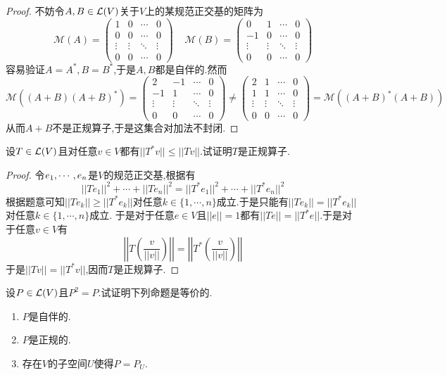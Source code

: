 \documentclass{ctexart}
\begin{document}
\begin{proof}
    不妨令$A,B\in\mathcal{L}(V)$关于$V$上的某规范正交基的矩阵为
    \[\mathcal{M}(A)=\begin{pmatrix}
        1&0&\cdots&0\\
        0&0&\cdots&0\\
        \vdots&\vdots&\ddots&\vdots\\
        0&0&\cdots&0
    \end{pmatrix}\ \ \ \ \ 
    \mathcal{M}(B)=\begin{pmatrix}
        0&1&\cdots&0\\
        -1&0&\cdots&0\\
        \vdots&\vdots&\ddots&\vdots\\
        0&0&\cdots&0
    \end{pmatrix}\]
    容易验证$A=A^*,B=B^*$,于是$A,B$都是自伴的.然而
    \[\mathcal{M}((A+B)(A+B)^*)=
    \begin{pmatrix}
        2&-1&\cdots&0\\
        -1&1&\cdots&0\\
        \vdots&\vdots&\ddots&\vdots\\
        0&0&\cdots&0
    \end{pmatrix}\neq
    \begin{pmatrix}
        2&1&\cdots&0\\
        1&1&\cdots&0\\
        \vdots&\vdots&\ddots&\vdots\\
        0&0&\cdots&0
    \end{pmatrix}=\mathcal{M}((A+B)^*(A+B))\]
    从而$A+B$不是正规算子,于是这集合对加法不封闭.
\end{proof}
\begin{problem}[19.]
    设$T\in\mathcal{L}(V)$且对任意$v\in V$都有$||T^*v||\leqslant||Tv||$.试证明$T$是正规算子.
\end{problem}
\begin{proof}
    令${e}_1,\cdots,{e}_{n}$是$V$的规范正交基,根据有
    \[||Te_1||^2+\cdots+||Te_n||^2=||T^*e_1||^2+\cdots+||T^*e_n||^2\]
    根据题意可知$||Te_k||\geqslant||T^*e_k||$对任意$k\in\{1,\cdots,n\}$成立.于是只能有$||Te_k||=||T^*e_k||$对任意$k\in\{1,\cdots,n\}$成立.%
    于是对于任意$e\in V$且$||e||=1$都有$||Te||=||T^*e||$.于是对于任意$v\in V$有
    \[\left|\left|T\left(\dfrac{v}{||v||}\right)\right|\right|=\left|\left|T^*\left(\dfrac{v}{||v||}\right)\right|\right|\]
    于是$||Tv||=||T^*v||$,因而$T$是正规算子.
\end{proof}
\begin{problem}[20.]
    设$P\in\mathcal{L}(V)$且$P^2=P$.试证明下列命题是等价的.
    \begin{enumerate}[label=\tbf{(\alph*)}]
        \item $P$是自伴的.
        \item $P$是正规的.
        \item 存在$V$的子空间$U$使得$P=P_U$.
    \end{enumerate}
\end{problem}
\end{document}
